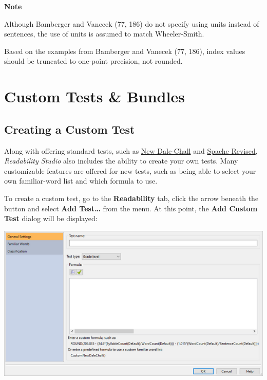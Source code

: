 \documentclass[
]{book}
\newenvironment{notesection}
    {
    \begin{tcolorbox}[colframe=mediumblue,colback=lightblue,coltext=mediumblue,arc=3mm]
    \faLightbulb[regular] \textbf{Note} \newline
    }
    {
    \end{tcolorbox}
    }
\theoremstyle{definition}
\theoremstyle{definition}
\theoremstyle{definition}
\theoremstyle{definition}
\theoremstyle{remark}
\begin{document}
\begin{notesection}
Although Bamberger and Vanecek (77, 186) do not specify using units instead of sentences, the use of units is assumed to match Wheeler-Smith.

Based on the examples from Bamberger and Vanecek (77, 186), index values should be truncated to one-point precision, not rounded.

\end{notesection}

\hypertarget{custom-tests-bundles}{%
\chapter{Custom Tests \& Bundles}\label{custom-tests-bundles}}

\hypertarget{creating-custom-test}{%
\section{Creating a Custom Test}\label{creating-custom-test}}

Along with offering standard tests, such as \protect\hyperlink{dale-chall-test}{New Dale-Chall} and \protect\hyperlink{spache-test}{Spache Revised}, \emph{Readability Studio} also includes the ability to create your own tests. Many customizable features are offered for new tests, such as being able to select your own familiar-word list and which formula to use.

To create a custom test, go to the \textbf{Readability} tab, click the arrow beneath the  button and select \textbf{Add Test\ldots{}} from the menu. At this point, the \textbf{Add Custom Test} dialog will be displayed:

\includegraphics{Images/AddCustomTest.png}
\end{document}

